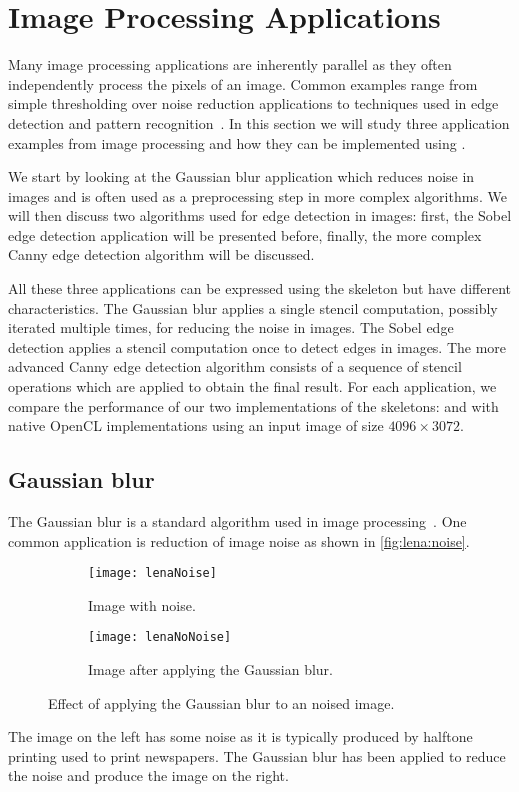 \section{Image Processing Applications}
Many image processing applications are inherently parallel as they often independently process the pixels of an image.
Common examples range from simple thresholding over noise reduction applications to techniques used in edge detection and pattern recognition~\cite{Umbaugh1997}.
In this section we will study three application examples from image processing and how they can be implemented using \SkelCL.

We start by looking at the Gaussian blur application which reduces noise in images and is often used as a preprocessing step in more complex algorithms.
We will then discuss two algorithms used for edge detection in images:
first, the Sobel edge detection application will be presented before, finally, the more complex Canny edge detection algorithm will be discussed.

All these three applications can be expressed using the \stencil skeleton but have different characteristics.
The Gaussian blur applies a single stencil computation, possibly iterated multiple times, for reducing the noise in images.
The Sobel edge detection applies a stencil computation once to detect edges in images.
The more advanced Canny edge detection algorithm consists of a sequence of stencil operations which are applied to obtain the final result.
For each application, we compare the performance of our two implementations of the \stencil skeletons:  and  with native OpenCL implementations using an input image of size $4096 \times 3072$.










\subsection{Gaussian blur}
\label{sec:gauss}
The Gaussian blur is a standard algorithm used in image processing~\cite{Umbaugh1997}.
One common application is reduction of image noise as shown in \autoref{fig:lena:noise}.
%
\begin{figure}[tb]
  \centering
  \begin{subfigure}[t]{.45\textwidth}
    \texttt{[image: lenaNoise]}
    \caption{Image with noise.}
    \label{fig:lena:noise:yes}
  \end{subfigure}
  \hfill
  \begin{subfigure}[t]{.45\textwidth}
    \texttt{[image: lenaNoNoise]}
    \caption{Image after applying the Gaussian blur.}
    \label{fig:lena:noise:no}
  \end{subfigure}
  \caption{Effect of applying the Gaussian blur to an noised image.}
  \label{fig:lena:noise}
\end{figure}
%
The image on the left has some noise as it is typically produced by halftone printing used to print newspapers.
The Gaussian blur has been applied to reduce the noise and produce the image on the right.

